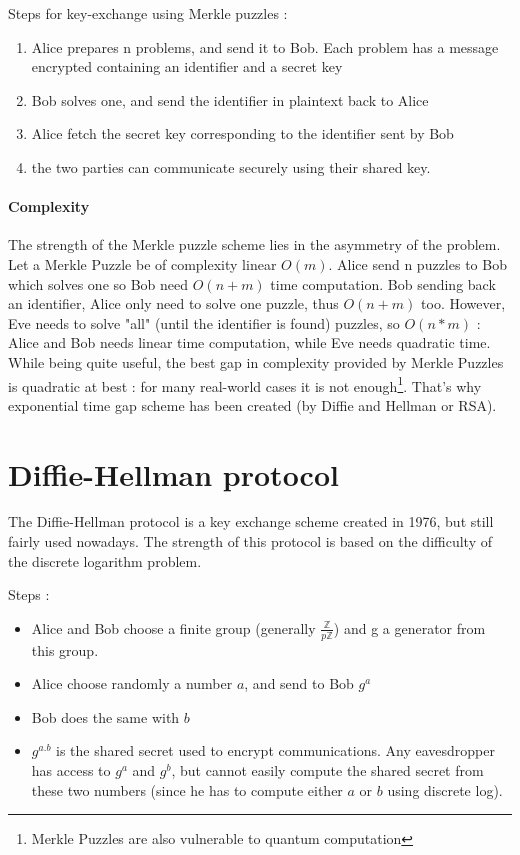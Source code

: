 Steps for key-exchange using Merkle puzzles :
\begin{enumerate}
	\item Alice prepares n problems, and send it to Bob. Each problem has a message encrypted containing an identifier and a secret key
	\item Bob solves one, and send the identifier in plaintext back to Alice
	\item Alice fetch the secret key corresponding to the identifier sent by Bob
	\item the two parties can communicate securely using their shared key.
\end{enumerate}

\paragraph{Complexity}

The strength of the Merkle puzzle scheme lies in the asymmetry of the problem. Let a Merkle Puzzle be of complexity linear $O(m)$.  Alice send n puzzles to Bob which solves one so Bob need $O(n+m)$ time computation. Bob sending back an identifier, Alice only need to solve one puzzle, thus $O(n+m)$ too. However, Eve needs to solve "all" (until the identifier is found) puzzles, so $O(n*m)$ : Alice and Bob needs linear time computation, while Eve needs quadratic time.\\

While being quite useful, the best gap in complexity provided by Merkle Puzzles is quadratic at best : for many real-world cases it is not enough\footnote{Merkle Puzzles are also vulnerable to quantum computation}. That's why exponential time gap scheme has been created (by Diffie and Hellman or RSA). 

\section{Diffie-Hellman protocol}
The Diffie-Hellman protocol is a key exchange scheme created in 1976, but still fairly used nowadays.  The strength of this protocol is based on the difficulty of the discrete logarithm problem. 

Steps : 
\begin{itemize}
	\item Alice and Bob choose a finite group (generally $\frac{\mathbb{Z}}{p\mathbb{Z}}$) and g a generator from this group. 
	\item Alice choose randomly a number $a$, and send to Bob $g^a$
	\item Bob does the same with $b$
	\item $g^{a.b}$ is the shared secret used to encrypt communications. Any eavesdropper has access to $g^{a}$ and $g^{b}$, but cannot easily compute the shared secret from these two numbers (since he has to compute either $a$ or $b$ using discrete log).
\end{itemize}

